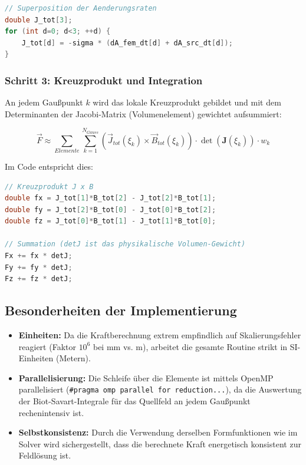 \documentclass[a4paper,12pt]{article}
\begin{document}
\begin{lstlisting}[language=C++]
// Superposition der Aenderungsraten
double J_tot[3];
for (int d=0; d<3; ++d) {
    J_tot[d] = -sigma * (dA_fem_dt[d] + dA_src_dt[d]);
}
\end{lstlisting}

\subsubsection{Schritt 3: Kreuzprodukt und Integration}
An jedem Gaußpunkt $k$ wird das lokale Kreuzprodukt gebildet und mit dem Determinanten der Jacobi-Matrix (Volumenelement) gewichtet aufsummiert:

\begin{equation}
    \vec{F} \approx \sum_{Elemente} \sum_{k=1}^{N_{Gauss}} \left( \vec{J}_{tot}(\xi_k) \times \vec{B}_{tot}(\xi_k) \right) \cdot \det(\mathbf{J}(\xi_k)) \cdot w_k
\end{equation}

Im Code entspricht dies:
\begin{lstlisting}[language=C++]
// Kreuzprodukt J x B
double fx = J_tot[1]*B_tot[2] - J_tot[2]*B_tot[1];
double fy = J_tot[2]*B_tot[0] - J_tot[0]*B_tot[2];
double fz = J_tot[0]*B_tot[1] - J_tot[1]*B_tot[0];

// Summation (detJ ist das physikalische Volumen-Gewicht)
Fx += fx * detJ; 
Fy += fy * detJ; 
Fz += fz * detJ;
\end{lstlisting}

\subsection{Besonderheiten der Implementierung}
\begin{itemize}
    \item \textbf{Einheiten:} Da die Kraftberechnung extrem empfindlich auf Skalierungsfehler reagiert (Faktor $10^6$ bei mm vs. m), arbeitet die gesamte Routine strikt in SI-Einheiten (Metern).
    \item \textbf{Parallelisierung:} Die Schleife über die Elemente ist mittels OpenMP parallelisiert (\texttt{\#pragma omp parallel for reduction...}), da die Auswertung der Biot-Savart-Integrale für das Quellfeld an jedem Gaußpunkt rechenintensiv ist.
    \item \textbf{Selbstkonsistenz:} Durch die Verwendung derselben Formfunktionen wie im Solver wird sichergestellt, dass die berechnete Kraft energetisch konsistent zur Feldlösung ist.
\end{itemize}
\newpage
\end{document}
